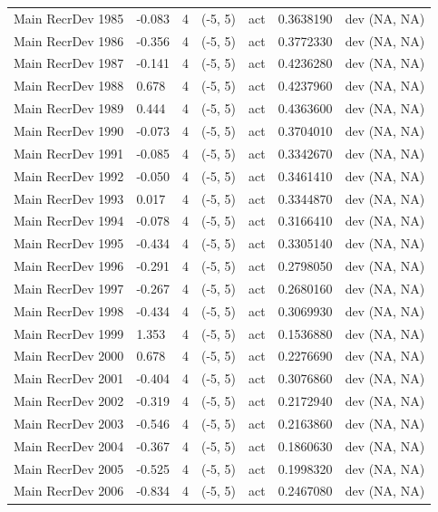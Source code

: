\documentclass[11pt,
  english,
]{article}
\begin{document}
\begin{landscape}
\begin{longtable}[t]{lllllll}
Main RecrDev 1985 & -0.083 & 4 & (-5, 5) & act & 0.3638190 & dev (NA, NA)\\
Main RecrDev 1986 & -0.356 & 4 & (-5, 5) & act & 0.3772330 & dev (NA, NA)\\
Main RecrDev 1987 & -0.141 & 4 & (-5, 5) & act & 0.4236280 & dev (NA, NA)\\
\addlinespace
Main RecrDev 1988 & 0.678 & 4 & (-5, 5) & act & 0.4237960 & dev (NA, NA)\\
Main RecrDev 1989 & 0.444 & 4 & (-5, 5) & act & 0.4363600 & dev (NA, NA)\\
Main RecrDev 1990 & -0.073 & 4 & (-5, 5) & act & 0.3704010 & dev (NA, NA)\\
Main RecrDev 1991 & -0.085 & 4 & (-5, 5) & act & 0.3342670 & dev (NA, NA)\\
Main RecrDev 1992 & -0.050 & 4 & (-5, 5) & act & 0.3461410 & dev (NA, NA)\\
\addlinespace
Main RecrDev 1993 & 0.017 & 4 & (-5, 5) & act & 0.3344870 & dev (NA, NA)\\
Main RecrDev 1994 & -0.078 & 4 & (-5, 5) & act & 0.3166410 & dev (NA, NA)\\
Main RecrDev 1995 & -0.434 & 4 & (-5, 5) & act & 0.3305140 & dev (NA, NA)\\
Main RecrDev 1996 & -0.291 & 4 & (-5, 5) & act & 0.2798050 & dev (NA, NA)\\
Main RecrDev 1997 & -0.267 & 4 & (-5, 5) & act & 0.2680160 & dev (NA, NA)\\
\addlinespace
Main RecrDev 1998 & -0.434 & 4 & (-5, 5) & act & 0.3069930 & dev (NA, NA)\\
Main RecrDev 1999 & 1.353 & 4 & (-5, 5) & act & 0.1536880 & dev (NA, NA)\\
Main RecrDev 2000 & 0.678 & 4 & (-5, 5) & act & 0.2276690 & dev (NA, NA)\\
Main RecrDev 2001 & -0.404 & 4 & (-5, 5) & act & 0.3076860 & dev (NA, NA)\\
Main RecrDev 2002 & -0.319 & 4 & (-5, 5) & act & 0.2172940 & dev (NA, NA)\\
\addlinespace
Main RecrDev 2003 & -0.546 & 4 & (-5, 5) & act & 0.2163860 & dev (NA, NA)\\
Main RecrDev 2004 & -0.367 & 4 & (-5, 5) & act & 0.1860630 & dev (NA, NA)\\
Main RecrDev 2005 & -0.525 & 4 & (-5, 5) & act & 0.1998320 & dev (NA, NA)\\
Main RecrDev 2006 & -0.834 & 4 & (-5, 5) & act & 0.2467080 & dev (NA, NA)\\

\end{longtable}
\end{landscape}
\end{document}
